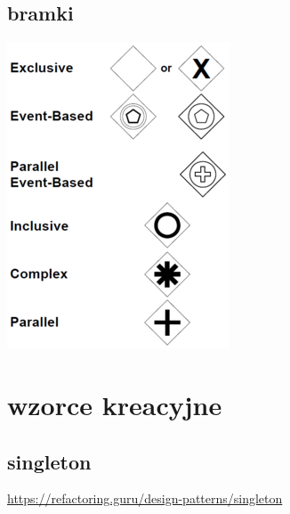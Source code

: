 \documentclass[11pt]{article}
\begin{document}
\subsection{bramki}
\label{sec:orge5f2d61}
\begin{center}
\includegraphics[width=.9\linewidth]{./bpmngate.png}
\end{center}
\section{wzorce kreacyjne}
\label{sec:org0d07884}
\subsection{singleton}
\label{sec:org2e3b3f1}
\url{https://refactoring.guru/design-patterns/singleton}
\end{document}
